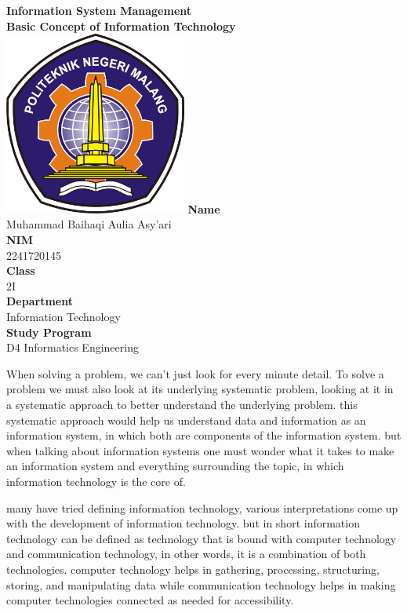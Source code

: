 \documentclass[12pt,titlepage]{article}
\newcommand{\vSubject}{Information System Management}
\newcommand{\vSubtitle}{Basic Concept of Information Technology}
\newcommand{\vName}{Muhammad Baihaqi Aulia Asy'ari}
\newcommand{\vNIM}{2241720145}
\newcommand{\vClass}{2I}
\newcommand{\vDepartment}{Information Technology}
\newcommand{\vStudyProgram}{D4 Informatics Engineering}
\begin{document}
\begin{titlepage}
    \centering
    \vfill
    {\bfseries\LARGE
        \vSubject\\
        \vskip0.25cm
        \vSubtitle
    }
    \vfill
    \includegraphics[width=6cm]{images/polinema-logo.png}
    \vfill
    {
        \textbf{Name}\\
        \vName\\
        \vskip0.5cm
        \textbf{NIM}\\
        \vNIM\\
        \vskip0.5cm
        \textbf{Class}\\
        \vClass\\
        \vskip0.5cm
        \textbf{Department}\\
        \vDepartment\\
        \vskip0.5cm
        \textbf{Study Program}\\
        \vStudyProgram
    }
\end{titlepage}

\newpage

When solving a problem, we can't just look for every minute detail. To solve a problem we must also look at its underlying systematic problem, looking at it in a systematic approach to better understand the underlying problem. this systematic approach would help us understand data and information as an information system, in which both are components of the information system. but when talking about information systems one must wonder what it takes to make an information system and everything surrounding the topic, in which information technology is the core of.

many have tried defining information technology, various interpretations come up with the development of information technology. but in short information technology can be defined as technology that is bound with computer technology and communication technology, in other words, it is a combination of both technologies. computer technology helps in gathering, processing, structuring, storing, and manipulating data while communication technology helps in making computer technologies connected as needed for accessibility.
\end{document}

